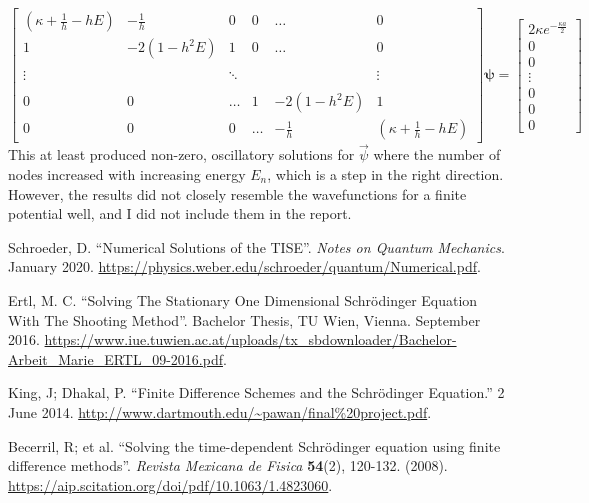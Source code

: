\documentclass[11pt, a4paper]{article}
\newcommand{\schro}{Schr\"{o}dinger\xspace}
\begin{document}
\begin{equation*}
\begin{bmatrix}
	\left(\kappa + \frac{1}{h} - hE\right) & -\frac{1}{h} & 0 & 0 & \ldots  & 0\\
	1 & - 2(1 - h^{2}E) & 1 & 0 & \ldots & 0\\
	& & & & &\\
	\vdots & & \ddots & & & \vdots \\
	& & & & &\\
	0 & 0 & \ldots & 1 & - 2(1 - h^{2}E) & 1\\
	0 & 0 & 0 & \ldots & -\frac{1}{h} & \left(\kappa + \frac{1}{h} - hE\right)
\end{bmatrix}
\bm{\psi}
= 
\begin{bmatrix}
	2\kappa e^{-\frac{\kappa a}{2}}\\
	0\\
	0\\
	\vdots\\
	0\\
	0\\
	0
\end{bmatrix}
\end{equation*}
This at least produced non-zero, oscillatory solutions for $ \vec{\psi} $ where the number of nodes increased with increasing energy $ E_{n} $, which is a step in the right direction. However, the results did not closely resemble the wavefunctions for a finite potential well, and I did not include them in the report.


\begin{thebibliography}{}
\setlength{\itemsep}{.2\itemsep}\setlength{\parsep}{.5\parsep}

 Schroeder, D. ``Numerical Solutions of the TISE''. \textit{Notes on Quantum Mechanics}. January 2020. \url{https://physics.weber.edu/schroeder/quantum/Numerical.pdf}.

 Ertl, M. C. ``Solving The Stationary One Dimensional \schro Equation With The Shooting Method''. Bachelor Thesis, TU Wien, Vienna. September 2016. \url{https://www.iue.tuwien.ac.at/uploads/tx_sbdownloader/Bachelor-Arbeit_Marie_ERTL_09-2016.pdf}.

 King, J; Dhakal, P. ``Finite Difference Schemes and the \schro Equation.'' 2 June 2014. \url{http://www.dartmouth.edu/~pawan/final%20project.pdf}. 

 Becerril, R; et al. ``Solving the time-dependent \schro equation using finite difference methods''. \textit{Revista Mexicana de Fisica} \textbf{54}(2), 120-132. (2008). \url{https://aip.scitation.org/doi/pdf/10.1063/1.4823060}.  %


\end{thebibliography}
\end{document}
